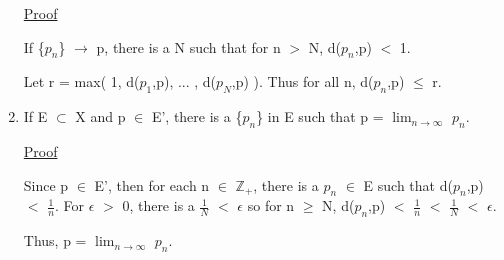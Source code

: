 \begin{enumerate}[label=(\alph*), leftmargin=2cm, itemsep=0.4em]
            { \color{magenta} \underline{Proof} }

                If \{$p_n$\} $\rightarrow$ p,
                there is a N such that for n $>$ N, d($p_n$,p) $<$ 1.

                Let r = max( 1, d($p_1$,p), ... , d($p_N$,p) ).
                Thus for all n, d($p_n$,p) $\leq$ r.

        \item If E $\subset$ X and p $\in$ E', there is a \{$p_n$\}
        in E such that p = $\lim_{n \rightarrow \infty}$ $p_n$.

            { \color{magenta} \underline{Proof} }

                Since p $\in$ E', then for each n $\in$ $\mathbb{Z}_+$,
                there is a $p_n$ $\in$ E such that d($p_n$,p) $<$ $\frac{1}{n}$.
                For $\epsilon$ $>$ 0, there is a $\frac{1}{N}$ $<$ $\epsilon$
                so for n $\geq$ N,
                d($p_n$,p) $<$ $\frac{1}{n}$ $<$ $\frac{1}{N}$ $<$ $\epsilon$.

                Thus, p = $\lim_{n \rightarrow \infty}$ $p_n$. \\
    \end{enumerate}

\newpage

    























































